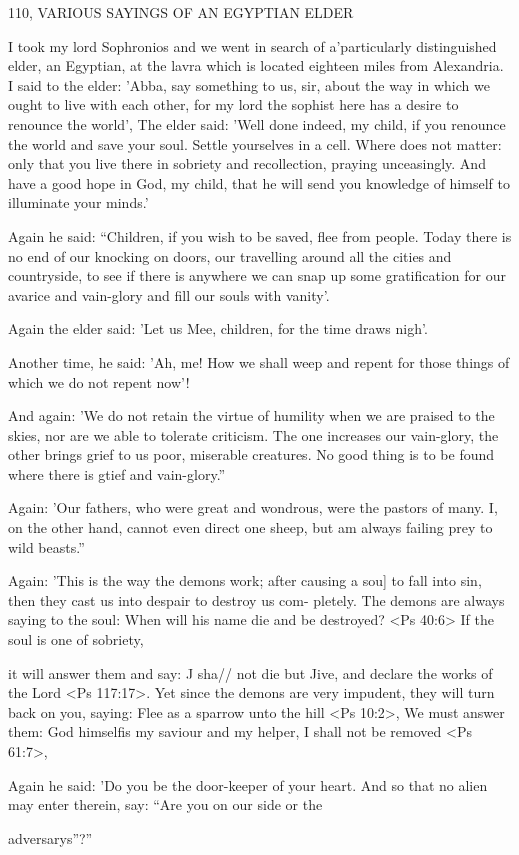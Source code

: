 110, VARIOUS SAYINGS OF AN EGYPTIAN ELDER

I took my lord Sophronios and we went in search of a'particularly
distinguished elder, an Egyptian, at the lavra which is located
eighteen miles from Alexandria.
I said to the elder: 'Abba, say
something to us, sir, about the way in which we ought to live with
each other, for my lord the sophist here has a desire to renounce the
world', The elder said: 'Well done indeed, my child, if you renounce
the world and save your soul.
Settle yourselves in a cell.
Where does
not matter: only that you live there in sobriety and recollection,
praying unceasingly.
And have a good hope in God, my child, that
he will send you knowledge of himself to illuminate your minds.'

Again he said: “Children, if you wish to be saved, flee from
people.
Today there is no end of our knocking on doors, our
travelling around all the cities and countryside, to see if there is
anywhere we can snap up some gratification for our avarice and
vain-glory and fill our souls with vanity'.

Again the elder said: 'Let us Mee, children, for the time draws
nigh'.

Another time, he said: 'Ah, me! How we shall weep and repent
for those things of which we do not repent now'!

And again: 'We do not retain the virtue of humility when we
are praised to the skies, nor are we able to tolerate criticism.
The
one increases our vain-glory, the other brings grief to us poor,
miserable creatures.
No good thing is to be found where there is
gtief and vain-glory.”

Again: 'Our fathers, who were great and wondrous, were the
pastors of many.
I, on the other hand, cannot even direct one sheep,
but am always failing prey to wild beasts.”

Again: 'This is the way the demons work; after causing a sou]
to fall into sin, then they cast us into despair to destroy us com-
pletely.
The demons are always saying to the soul: When will his
name die and be destroyed? <Ps 40:6> If the soul is one of sobriety,

it will answer them and say: J sha// not die but Jive, and declare the
works of the Lord <Ps 117:17>.
Yet since the demons are very
impudent, they will turn back on you, saying: Flee as a sparrow
unto the hill <Ps 10:2>, We must answer them: God himselfis my
saviour and my helper, I shall not be removed <Ps 61:7>,

Again he said: 'Do you be the door-keeper of your heart.
And
so that no alien may enter therein, say: “Are you on our side or the

adversary\textquotesingle s”?”

